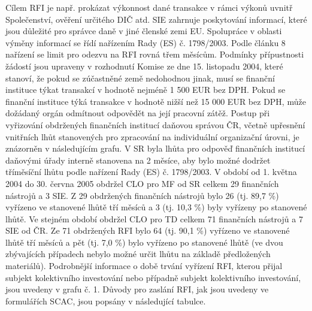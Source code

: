 \documentclass[10pt]{article}
\begin{document}
Cílem RFI je např. prokázat výkonnost dané transakce v rámci výkonů uvnitř Společenství, ověření určitého DIČ atd.
SIE zahrnuje poskytování informací, které jsou důležité pro správce daně v jiné členské zemi EU.
Spolupráce v oblasti výměny informací se řídí nařízením Rady (ES) č. 1798/2003.
Podle článku 8 nařízení se limit pro odezvu na RFI rovná třem měsícům.
Podmínky přípustnosti žádostí jsou upraveny v rozhodnutí Komise ze dne 15. listopadu 2004, které stanoví, že pokud se zúčastněné země nedohodnou jinak, musí se finanční instituce týkat transakcí v hodnotě nejméně 1 500 EUR bez DPH.
Pokud se finanční instituce týká transakce v hodnotě nižší než 15 000 EUR bez DPH, může dožádaný orgán odmítnout odpovědět na její pracovní zátěž.
Postup při vyřizování obdržených finančních institucí daňovou správou ČR, včetně upřesnění vnitřních lhůt stanovených pro zpracování na individuální organizační úrovni, je znázorněn v následujícím grafu.
V SR byla lhůta pro odpověď finančních institucí daňovými úřady interně stanovena na 2 měsíce, aby bylo možné dodržet tříměsíční lhůtu podle nařízení Rady (ES) č. 1798/2003.
V období od 1. května 2004 do 30. června 2005 obdržel CLO pro MF od SR celkem 29 finančních nástrojů a 3 SIE.
Z 29 obdržených finančních nástrojů bylo 26 (tj. 89,7 \%) vyřízeno ve stanovené lhůtě tří měsíců a 3 (tj. 10,3 \%) byly vyřízeny po stanovené lhůtě.
Ve stejném období obdržel CLO pro TD celkem 71 finančních nástrojů a 7 SIE od ČR.
Ze 71 obdržených RFI bylo 64 (tj. 90,1 \%) vyřízeno ve stanovené lhůtě tří měsíců a pět (tj. 7,0 \%) bylo vyřízeno po stanovené lhůtě (ve dvou zbývajících případech nebylo možné určit lhůtu na základě předložených materiálů).
Podrobnější informace o době trvání vyřízení RFI, kterou přijal subjekt kolektivního investování nebo případně subjekt kolektivního investování, jsou uvedeny v grafu č. 1.
Důvody pro zaslání RFI, jak jsou uvedeny ve formulářích SCAC, jsou popsány v následující tabulce.
\end{document}

